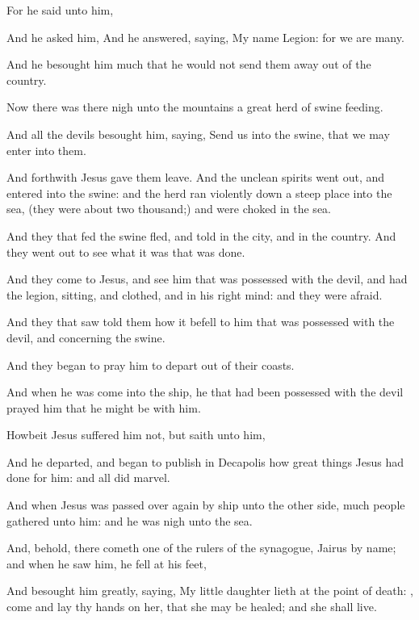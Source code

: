 {For he
said unto
him,
{}

And he
asked
him,
{}
And he
answered,
saying,
My
name
{}
Legion:
for we
are
many.

And he
besought
him
much
that he
would
not
send
them away out
of the
country.

Now there
was
there
nigh unto the
mountains
a
great
herd of
swine
feeding.

And
all the
devils
besought
him,
saying,
Send
us
into the
swine,
that we may
enter
into
them.

And
forthwith
Jesus
gave
them
leave.
And
the
unclean
spirits went
out, and
entered
into the
swine:
and the
herd ran
violently
down a steep
place
into the
sea, (they
were
about two
thousand;)
and were
choked
in the
sea.

And they that
fed the
swine
fled,
and
told
{}
in the
city,
and
in the
country.
And they went
out to
see
what it
was that was
done.

And they
come
to
Jesus,
and
see him that was possessed with the
devil, and
had the
legion,
sitting,
and
clothed,
and in his right
mind:
and they were
afraid.

And they that
saw
{}
told
them
how it befell to him that was possessed with the
devil,
and
{}
concerning the
swine.

And they
began to
pray
him to
depart
out
of
their
coasts.

And
when
he was
come
into the
ship, he that had been possessed with the
devil
prayed
him
that he might
be
with
him.

Howbeit
Jesus
suffered
him
not,
but
saith unto
him,
{}

And he
departed,
and
began to
publish
in
Decapolis how great
things
Jesus had
done for
him:
and
all
{} did
marvel.

And
when
Jesus was passed
over
again
by
ship
unto the other
side,
much
people
gathered
unto
him:
and he
was nigh
unto the
sea.

And,
behold, there
cometh
one of the rulers of the
synagogue,
Jairus by
name;
and when he
saw
him, he
fell
at
his
feet,

And
besought
him
greatly,
saying,
My little
daughter
lieth at the point of
death:
{},
come and
lay thy
hands on
her,
that she may be
healed;
and she shall
live.

}

